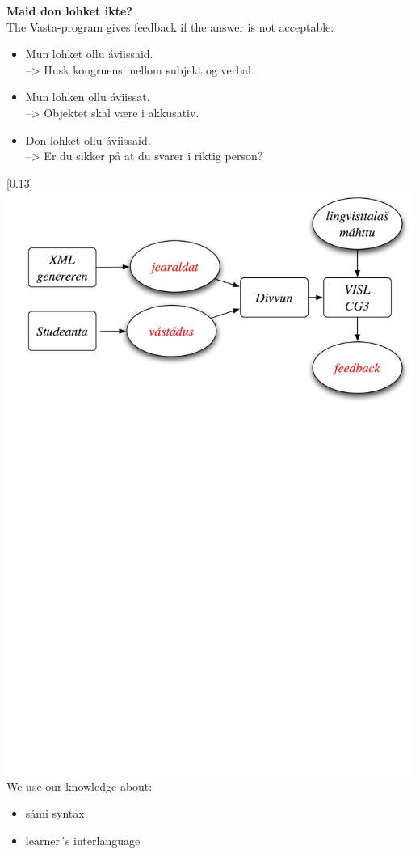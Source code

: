 \documentclass[landscape,norsk,11pt]{seminar}
\begin{document}
\begin{slide}
\newslide
\textbf{Maid don lohket ikte?}\\
The Vasta-program gives feedback if the answer is not acceptable:
\begin{itemize}
\item Mun lohket ollu \'aviissaid. \\ --> Husk kongruens mellom subjekt og verbal.
\item Mun lohken ollu \'aviissat. \\ --> Objektet skal være i akkusativ.
\item Don lohket ollu \'aviissaid. \\ --> Er du sikker på at du svarer i riktig person?
\end{itemize}

\newslide
\scalebox{0.13}[0.13]{\includegraphics{img/skovi.png}} 
\newslide
We use our knowledge about:
\begin{itemize}
\item sámi syntax
\item learner´s interlanguage
\end{itemize}


\end{slide}
\end{document}
